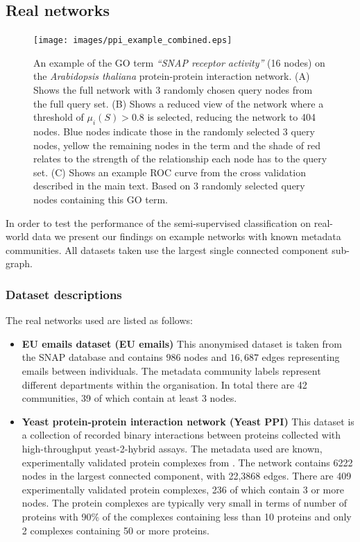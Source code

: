 \documentclass[sigconf]{acmart}
\begin{document}
\subsection{Real networks}

\begin{figure}[ht]
\texttt{[image: images/ppi\_example\_combined.eps]}
\caption{An example of the GO term \textit{``SNAP receptor activity''} (16 nodes) on the \textit{Arabidopsis thaliana} protein-protein interaction network.
(A) Shows the full network with 3 randomly chosen query nodes from the full query set.
(B) Shows a reduced view of the network where a threshold of $\mu_i(S) > 0.8$ is selected, reducing the network to 404 nodes.
Blue nodes indicate those in the randomly selected 3 query nodes, yellow the remaining nodes in the term and the shade of red relates to the strength of the relationship each node has to the query set.
(C) Shows an example ROC curve from the cross validation described in the main text. 
Based on 3 randomly selected query nodes containing this GO term.
}
\label{fig:query_example}
\end{figure}

In order to test the performance of the semi-supervised classification on real-world data we present our findings on example networks with known metadata communities.
All datasets taken use the largest single connected component sub-graph.

\subsubsection{Dataset descriptions}
\label{sec:real_network_descs}
The real networks used are listed as follows:
\begin{itemize}
 \item \textbf{EU emails dataset (EU emails)} This anonymised dataset is taken from the SNAP database \cite{snap} and contains $986$ nodes and $16,687$ edges representing emails between individuals.
 The metadata community labels represent different departments within the organisation.
 In total there are 42 communities, 39 of which contain at least 3 nodes.
 
 \item \textbf{Yeast protein-protein interaction network (Yeast PPI)} \cite{yeast_ppi}
 This dataset is a collection of recorded binary interactions between proteins collected with high-throughput yeast-2-hybrid assays.
 The metadata used are known, experimentally validated protein complexes from \cite{yeast_ppi_complexes}.
 The network contains 6222 nodes in the largest connected component, with 22,3868 edges.
 There are 409 experimentally validated protein complexes, 236 of which contain 3 or more nodes.
 The protein complexes are typically very small in terms of number of proteins with  90\% of the complexes containing less than 10 proteins and only 2 complexes containing 50 or more proteins.
 
\end{itemize}
\end{document}
